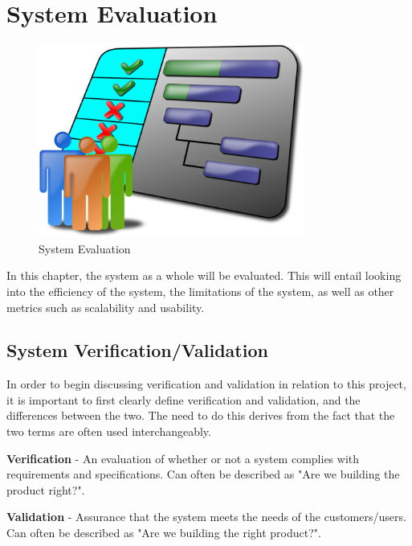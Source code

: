 \chapter{System Evaluation}
\label{sec:SystemEvaluation}

\begin{figure}[H]
    \centering
    \includegraphics[width=\textwidth, height=180pt]{img/evaluation.png}
    \caption{System Evaluation}
    \label{fig:my_label}
\end{figure}

\bigskip

In this chapter, the system as a whole will be evaluated. This will entail looking into the efficiency of the system, the limitations of the system, as well as other metrics such as scalability and usability.

\section{System Verification/Validation}
\label{sec:SystemEvaluationVerification}
In order to begin discussing verification and validation in relation to this project, it is important to first clearly define verification and validation, and the differences between the two. The need to do this derives from the fact that the two terms are often used interchangeably\cite{guide2001project}.

\textbf{Verification} - An evaluation of whether or not a system complies with requirements and specifications. Can often be described as "Are we building the product right?".

\textbf{Validation} - Assurance that the system meets the needs of the customers/users. Can often be described as "Are we building the right product?".

